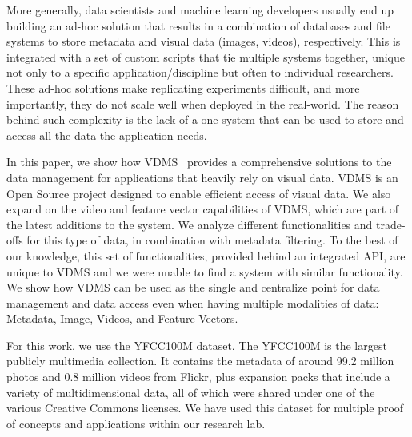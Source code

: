 More generally, data scientists and machine learning developers 
usually end up building an ad-hoc solution that results in a 
combination of databases and file systems to store 
metadata and visual data (images, videos), respectively. 
This is integrated with a set of custom scripts that tie multiple systems together, 
unique not only to a specific application/discipline but often to individual researchers.
These ad-hoc solutions make replicating experiments difficult, 
and more importantly, they do not scale well when deployed in the real-world.
The reason behind such complexity is the lack of a one-system 
that can be used to store and access all the data the application needs.

In this paper, we show how VDMS~\cite{vdms-nips} provides a comprehensive solutions 
to the data management for applications that heavily rely on visual data. 
VDMS is an Open Source project designed to enable efficient access of visual data.
We also expand on the video and feature vector capabilities of
VDMS, which are part of the latest additions to the system.
We analyze different functionalities and trade-offs for this type of data,
in combination with metadata filtering. 
To the best of our knowledge, this set of functionalities, 
provided behind an integrated API, are unique to VDMS and 
we were unable to find a system with similar functionality.
We show how VDMS can be used as the single and centralize point for data
management and data access even when having multiple modalities of data:
Metadata, Image, Videos, and Feature Vectors.

For this work, we use the YFCC100M dataset\cite{Thomee_2016}. 
The YFCC100M is the largest publicly multimedia collection. 
It contains the metadata of around 99.2 million photos 
and 0.8 million videos from Flickr,
plus expansion packs that include a variety of multidimensional data,
all of which were shared under one of the various Creative Commons licenses.
We have used this dataset
for multiple proof of concepts and applications within our research lab. 
